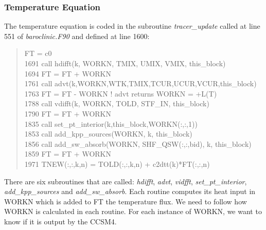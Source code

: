 \subsubsection{Temperature Equation}\label{TE}

The temperature equation is coded in the subroutine \textit{tracer\_update} called at line 551 of \textit{baroclinic.F90} and defined at line 1600: 
\begin{quotation}
\small
\linespread{0.5}\selectfont{} \hspace{1em} FT    = c0\\
1691  \hspace{1em} call hdifft(k, WORKN, TMIX, UMIX, VMIX, this\_block)\\
1694 \hspace{1em}  FT = FT + WORKN\\
 1761 \hspace{1em} call advt(k,WORKN,WTK,TMIX,TCUR,UCUR,VCUR,this\_block)\\
 1763 \hspace{1em} FT = FT - WORKN   ! advt returns WORKN = +L(T) \\
1788 \hspace{1em}  call vdifft(k, WORKN, TOLD, STF\_IN, this\_block)\\
1790 \hspace{1em}  FT = FT + WORKN\\
 1835\hspace{1em}  call set\_pt\_interior(k,this\_block,WORKN(:,:,1))\\
1853 \hspace{1em}  call add\_kpp\_sources(WORKN, k, this\_block)\\
 1856 \hspace{1em} call add\_sw\_absorb(WORKN, SHF\_QSW(:,:,bid), k, this\_block)\\
1859 \hspace{1em}  FT = FT + WORKN\\
1971 \hspace{1em} TNEW(:,:,k,n) = TOLD(:,:,k,n) + c2dtt(k)*FT(:,:,n)
\end{quotation}

There are six subroutines that are called: \textit{hdifft}, \textit{advt}, \textit{vidfft}, \textit{set\_pt\_interior}, \textit{add\_kpp\_sources} and \textit{add\_sw\_absorb}. Each routine computes its heat input in WORKN which is added to FT the temperature flux. We need to follow how WORKN is calculated in each routine. For each instance of WORKN, we want to know if it is output by the CCSM4.


